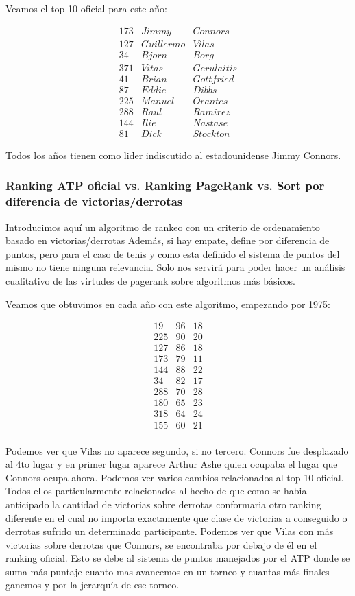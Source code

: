 Veamos el top 10 oficial para este año:

\begin{eqnarray*}
173 & Jimmy & Connors \\
127 & Guillermo & Vilas \\
34 & Bjorn & Borg \\
371 & Vitas & Gerulaitis \\
41 & Brian & Gottfried \\
87 & Eddie & Dibbs \\
225 & Manuel & Orantes \\
288 & Raul & Ramirez \\
144 & Ilie & Nastase \\
81 & Dick & Stockton 
\end{eqnarray*}

Todos los años tienen como lider indiscutido al estadounidense Jimmy Connors.

\subsubsection{Ranking ATP oficial vs. Ranking PageRank vs. Sort por diferencia de victorias/derrotas}

Introducimos aquí un algoritmo de rankeo con un criterio de ordenamiento basado en victorias/derrotas Además, si hay empate, define por diferencia de puntos, pero para el caso de tenis y como esta definido el sistema de puntos del mismo no tiene ninguna relevancia. Solo nos servirá para poder hacer un análisis cualitativo de las virtudes de pagerank sobre algoritmos más básicos.

Veamos que obtuvimos en cada año con este algoritmo, empezando por 1975:

\begin{eqnarray*}
19 & 96 & 18 \\
225 & 90  & 20 \\
127 & 86 & 18 \\
173 & 79 & 11 \\
144 & 88 & 22 \\
34 & 82 & 17 \\
288 & 70 & 28 \\
180 & 65 & 23 \\
318 & 64 & 24 \\
155 & 60 & 21 \\
\end{eqnarray*}

Podemos ver que Vilas no aparece segundo, si no tercero. Connors fue desplazado al 4to lugar y en primer lugar aparece Arthur Ashe quien ocupaba el lugar que Connors ocupa ahora. Podemos ver varios cambios relacionados al top 10 oficial. Todos ellos particularmente relacionados al hecho de que como se habia anticipado la cantidad de victorias sobre derrotas conformaria otro ranking diferente en el cual no importa exactamente que clase de victorias a conseguido o derrotas sufrido un determinado participante. Podemos ver que Vilas con más victorias sobre derrotas que Connors, se encontraba por debajo de él en el ranking oficial. Esto se debe al sistema de puntos manejados por el ATP donde se suma más puntaje cuanto mas avancemos en un torneo y cuantas más finales ganemos y por la jerarquía de ese torneo. 

